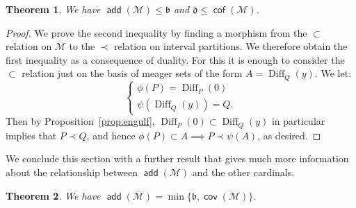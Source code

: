 \documentclass[11pt,oneside,a4paper]{amsbook}
\newcommand{\Meager}{\mathcal M}
\DeclareMathOperator{\add}{\mathsf{add}}
\DeclareMathOperator{\cov}{\mathsf{cov}}
\DeclareMathOperator{\cof}{\mathsf{cof}}
\DeclareMathOperator{\Diff}{Diff}
\theoremstyle{definition}
\theoremstyle{plain}
\newtheorem{theorem}{Theorem}[section]
\theoremstyle{definition}
\theoremstyle{remark}
\numberwithin{equation}{section}
\numberwithin{figure}{section}
\begin{document}
\begin{theorem}
  \label{thm:addm-b}
  We have $\add(\Meager)\leq\mathfrak b$ and $\mathfrak d\leq\cof(\Meager)$.
\end{theorem}

\begin{proof}
  We prove the second inequality by finding a morphism from the $\subset$ relation on $\Meager$ to the $\prec$ relation on interval partitions. We therefore obtain the first inequality as a consequence of duality. For this it is enough to consider the $\subset$ relation just on the basis of meager sets of the form $A=\Diff_Q(y)$. We let:
  \[\begin{cases}\phi(P)=\Diff_P(0)\\\psi(\Diff_Q(y))=Q\text{.}\end{cases}
  \]
  Then by Proposition~\ref{prop:engulf}, $\Diff_P(0)\subset\Diff_Q(y)$ in particular implies that $P\prec Q$, and hence $\phi(P)\subset A\implies P\prec\psi(A)$, as desired.
\end{proof}

We conclude this section with a further result that gives much more information about the relationship between $\add(\Meager)$ and the other cardinals.

\begin{theorem}
  We have $\add(\Meager)=\min\{\mathfrak b,\cov(\Meager)\}$.
\end{theorem}
\end{document}
